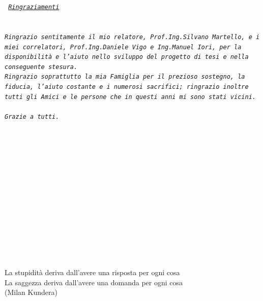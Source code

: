 \documentclass[12pt,a4paper,openright,twoside]{report}
\begin{document}
\tableofcontents
\clearpage{\pagestyle{empty}\cleardoublepage}
\begin{titlepage}              %

\thispagestyle{empty}                   %
\em                                     %
\tt
\noindent \underline{Ringraziamenti}\\
\noindent 
\\
\\Ringrazio sentitamente il mio relatore, Prof.Ing.Silvano Martello, e i miei correlatori, Prof.Ing.Daniele Vigo e Ing.Manuel Iori,
per la disponibilit\`{a} e l'aiuto nello sviluppo del progetto di tesi e nella conseguente stesura.\\
Ringrazio soprattutto la mia Famiglia per il prezioso sostegno, la fiducia, l'aiuto costante e i numerosi sacrifici; ringrazio inoltre tutti gli Amici e le persone che in questi anni mi sono stati vicini.
\\ \\
Grazie a tutti. 
\\ \\ \\ \\ \\ \\ \\ \\ \\ \\ \\ \\ \\ \\ \\
\begin{flushright}
\begin{scriptsize}
La stupidit\`{a} deriva dall'avere una risposta per ogni cosa\\La saggezza deriva dall'avere una domanda per ogni cosa \\ (Milan Kundera)
\end{scriptsize}
\end{flushright}
\newpage                                %
\clearpage{\pagestyle{empty}\cleardoublepage}
\end{titlepage}
\end{document}
